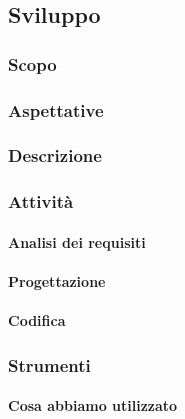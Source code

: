 	\subsection{Sviluppo}
		\subsubsection{Scopo}
		\subsubsection{Aspettative}
		\subsubsection{Descrizione}
		\subsubsection{Attività}
			\paragraph{Analisi dei requisiti}
			\paragraph{Progettazione}
			\paragraph{Codifica}
		\subsubsection{Strumenti}
			\paragraph{Cosa abbiamo utilizzato}
		